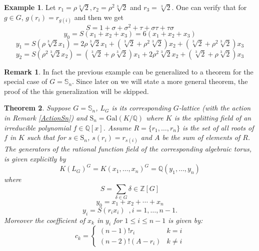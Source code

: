 \documentclass{article}
\theoremstyle{plain}
\newtheorem{theorem}{Theorem}
\theoremstyle{definition}
\newtheorem{example}[theorem]{Example}
\newtheorem*{remark}{Remark}
\newcommand{\Z}{\ensuremath{\mathbb{Z}}}
\newcommand{\Q}{\ensuremath{\mathbb{Q}}}
\begin{document}
\begin{example}
\noindent
Let $r_1 = \rho \sqrt[3]{2}, r_2 = \rho^2 \sqrt[3]{2}$ and $r_3 = \sqrt[3]{2}$. One can verify that for $g \in G$, $g(r_i) = r_{g(i)}$ and then we get
 $$S= 1+\sigma +\sigma^2 +\tau +\sigma \tau +\tau \sigma $$
 $$y_0 = S(x_1+ x_2 + x_3)= 6(x_1+x_2+x_3)$$
 $$ y_1 = S(\rho \sqrt[3]{2} x_1) = 2\rho\sqrt[3]{2}x_1+(\sqrt[3]{2}+\rho^2 \sqrt[3]{2})x_2 + (\sqrt[3]{2}+\rho^2 \sqrt[3]{2})x_3 $$
 $$ y_2 = S(\rho^2\sqrt[3]{2}x_2) = (\sqrt[3]{2}+\rho \sqrt[3]{2})x_1 + 2\rho^2\sqrt[3]{2}x_2 + (\sqrt[3]{2}+\rho \sqrt[3]{2})x_3$$
 \end{example}
\begin{remark}
In fact the previous example can be generalized to a theorem for the special case of $G = \mathbb{S}_n$. Since later on we will state a more general theorem, the proof of the this generalization will be skipped.
\end{remark}
\begin{theorem}\label{specialcase}
Suppose $G = \mathbb{S}_n$, $L_G$ is its corresponding $G$-lattice (with the action in Remark \ref{ActionSn}) and $ \mathrm{S}_n = \mathrm{Gal}(K/\Q)$ where $K$ is the splitting field of an irreducible polynomial $ f \in \Q[x]$. Assume $R = \lbrace r_1, \ldots, r_n \rbrace$ is the set of all roots of $f$ in $K$ such that for $s \in \mathrm{S}_n$, $s(r_i) = r_{s(i)}$ and $A$ be the sum of elements of $R$. The generators of the rational function field of the corresponding algebraic torus, is given explicitly by$$K(L_G)^G = K(x_1, \ldots, x_n)^G = \Q(y_1, \ldots, y_n) $$ where $$S= \sum_{\delta \in G} \delta \in \Z[G]$$
$$y_0 = x_1+ x_2+ \cdots + x_n$$
 $$ y_i = S(r_ix_i) \,\,\, , i = 1, \ldots, n-1.$$ 
Moreover the coefficient of $x_k$ in $y_i$ for $1 \leq i \leq n-1$ is given by:$$  c_k = \begin{cases} (n-1)!r_i & k=i \\ (n-2)!(A-r_i) & k\neq i \end{cases}$$
\end{theorem}
\end{document}
